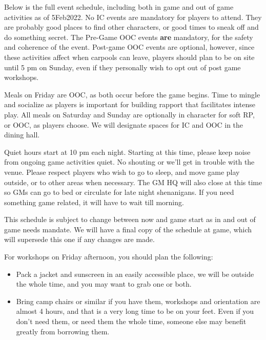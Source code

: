 \documentclass[green]{GL2020}
\begin{document}
\name{\gWeekendSchedule{}}

Below is the full event schedule, including both in game and out of game activities as of 5Feb2022. No IC events are mandatory for players to attend. They are probably good places to find other characters, or good times to sneak off and do something secret. The Pre-Game OOC events \textbf{are} mandatory, for the safety and coherence of the event. Post-game OOC events are optional, however, since these activities affect when carpools can leave, players should plan to be on site until 5 pm on Sunday, even if they personally wish to opt out of post game workshops.

Meals on Friday are OOC, as both occur before the game begins. Time to mingle and socialize as players is important for building rapport that facilitates intense play. All meals on Saturday and Sunday are optionally in character for soft RP, or OOC, as players choose. We will designate spaces for IC and OOC in the dining hall.

Quiet hours start at 10 pm each night. Starting at this time, please keep noise from ongoing game activities quiet. No shouting or we’ll get in trouble with the venue. Please respect players who wish to go to sleep, and move game play outside, or to other areas when necessary. The GM HQ will also close at this time so GMs can go to bed or circulate for late night shenanigans. If you need something game related, it will have to wait till morning.

This schedule is subject to change between now and game start as in and out of game needs mandate. We will have a final copy of the schedule at game, which will supersede this one if any changes are made.


For workshops on Friday afternoon, you should plan the following:
\begin{itemize}
	\item Pack a jacket and sunscreen in an easily accessible place, we will be outside the whole time, and you may want to grab one or both.
	\item Bring camp chairs or similar if you have them, workshops and orientation are almost 4 hours, and that is a very long time to be on your feet. Even if you don’t need them, or need them the whole time, someone else may benefit greatly from borrowing them.
\end{itemize}
\end{document}
